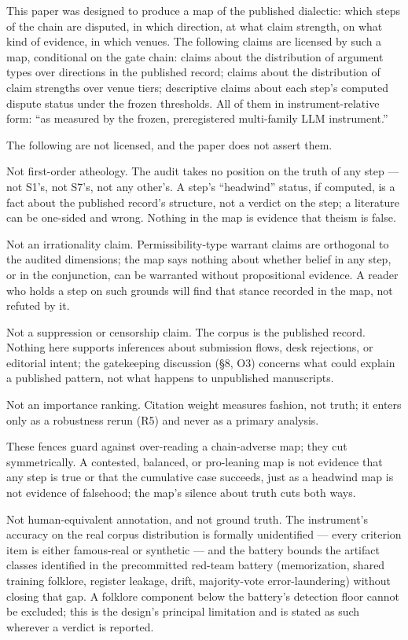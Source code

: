This paper was designed to produce a map of the published dialectic: which steps of the chain are disputed, in which direction, at what claim strength, on what kind of evidence, in which venues. The following claims are licensed by such a map, conditional on the gate chain: claims about the distribution of argument types over directions in the published record; claims about the distribution of claim strengths over venue tiers; descriptive claims about each step's computed dispute status under the frozen thresholds. All of them in instrument-relative form: ``as measured by the frozen, preregistered multi-family LLM instrument.''

The following are not licensed, and the paper does not assert them.

Not first-order atheology. The audit takes no position on the truth of any step --- not S1's, not S7's, not any other's. A step's ``headwind'' status, if computed, is a fact about the published record's structure, not a verdict on the step; a literature can be one-sided and wrong. Nothing in the map is evidence that theism is false.

Not an irrationality claim. Permissibility-type warrant claims are orthogonal to the audited dimensions; the map says nothing about whether belief in any step, or in the conjunction, can be warranted without propositional evidence. A reader who holds a step on such grounds will find that stance recorded in the map, not refuted by it.

Not a suppression or censorship claim. The corpus is the published record. Nothing here supports inferences about submission flows, desk rejections, or editorial intent; the gatekeeping discussion (\S{}8, O3) concerns what could explain a published pattern, not what happens to unpublished manuscripts.

Not an importance ranking. Citation weight measures fashion, not truth; it enters only as a robustness rerun (R5) and never as a primary analysis.

These fences guard against over-reading a chain-adverse map; they cut symmetrically. A contested, balanced, or pro-leaning map is not evidence that any step is true or that the cumulative case succeeds, just as a headwind map is not evidence of falsehood; the map's silence about truth cuts both ways.

Not human-equivalent annotation, and not ground truth. The instrument's accuracy on the real corpus distribution is formally unidentified --- every criterion item is either famous-real or synthetic --- and the battery bounds the artifact classes identified in the precommitted red-team battery (memorization, shared training folklore, register leakage, drift, majority-vote error-laundering) without closing that gap. A folklore component below the battery's detection floor cannot be excluded; this is the design's principal limitation and is stated as such wherever a verdict is reported.

